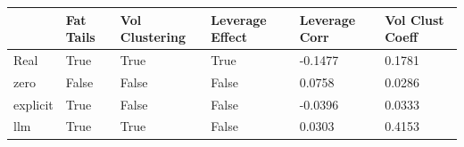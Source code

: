 \begin{tabular}{llllll}
\toprule
 & Fat Tails & Vol Clustering & Leverage Effect & Leverage Corr & Vol Clust Coeff \\
\midrule
Real & True & True & True & -0.1477 & 0.1781 \\
zero & False & False & False & 0.0758 & 0.0286 \\
explicit & True & False & False & -0.0396 & 0.0333 \\
llm & True & True & False & 0.0303 & 0.4153 \\
\bottomrule
\end{tabular}
